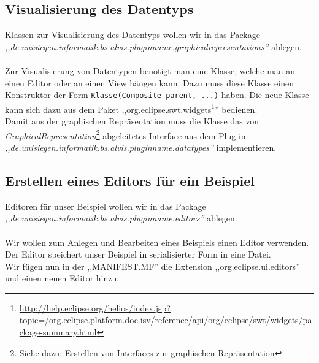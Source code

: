 \documentclass[10pt,a4paper]{article}
\begin{document}
\subsection{Visualisierung des Datentyps}
Klassen zur Visualisierung des Datentyps wollen wir in das Package \\ \emph{,,de.unisiegen.informatik.bs.alvis.pluginname.graphicalrepresentations''} ablegen.\\ 
\\
Zur Visualisierung von Datentypen benötigt man eine Klasse, welche man an einen Editor oder an einen View hängen kann. Dazu muss diese Klasse einen Konstruktor der Form 
\lstinline{Klasse(Composite parent, ...)} 
haben. Die neue Klasse kann sich dazu aus dem Paket 
,,org.eclipse.swt.widgets\footnote{
\href{http://help.eclipse.org/helios/index.jsp?topic=/org.eclipse.platform.doc.isv/reference/api/org/eclipse/swt/widgets/package-summary.html}{http://help.eclipse.org/helios/index.jsp?topic=/org.eclipse.platform.doc.isv/reference/api/org/eclipse/swt/widgets/package-summary.html}}''
bedienen. \\ 
Damit aus der graphischen Repräsentation  muss die Klasse das von 
\emph{GraphicalRepresentation}\footnote{Siehe dazu: Erstellen von Interfaces zur graphischen Repräsentation} abgeleitetes Interface aus dem Plug-in \\ \emph{,,de.unisiegen.informatik.bs.alvis.pluginname.datatypes''} implementieren.

\subsection{Erstellen eines Editors für ein Beispiel}
Editoren für unser Beispiel wollen wir in das Package \\ \emph{,,de.unisiegen.informatik.bs.alvis.pluginname.editors''} ablegen.\\ 
\\
Wir wollen zum Anlegen und Bearbeiten eines Beispiels einen Editor verwenden. Der Editor speichert unser Beispiel in serialisierter Form in eine Datei. \\
Wir fügen nun in der ,,MANIFEST.MF'' die Extension ,,org.eclipse.ui.editors''  und einen neuen Editor hinzu. \\
\end{document}
